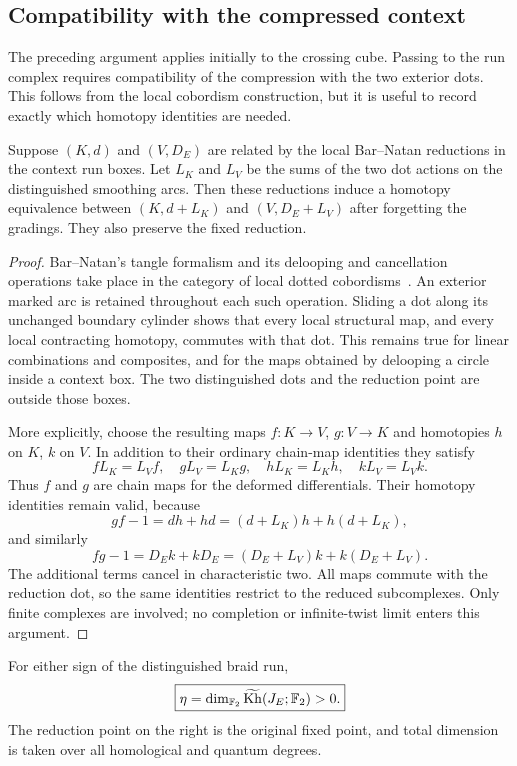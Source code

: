 \subsection{Compatibility with the compressed context}

The preceding argument applies initially to the crossing cube. Passing to
the run complex requires compatibility of the compression with the two
exterior dots. This follows from the local cobordism construction, but it
is useful to record exactly which homotopy identities are needed.

\begin{lemma}\label{slope-compression}
Suppose $(K,d)$ and $(V,D_E)$ are related by the local Bar--Natan
reductions in the context run boxes. Let $L_K$ and $L_V$ be the sums of the
two dot actions on the distinguished smoothing arcs. Then these reductions
induce a homotopy equivalence between $(K,d+L_K)$ and $(V,D_E+L_V)$ after
forgetting the gradings. They also preserve the fixed reduction.
\end{lemma}

\begin{proof}
Bar--Natan's tangle formalism and its delooping and cancellation operations
take place in the category of local dotted cobordisms~\cite{bn05,bn07}.
An exterior marked arc is retained throughout each such operation. Sliding
a dot along its unchanged boundary cylinder shows that every local
structural map, and every local contracting homotopy, commutes with that
dot. This remains true for linear combinations and composites, and for
the maps obtained by delooping a circle inside a context box. The two
distinguished dots and the reduction point are outside those boxes.

More explicitly, choose the resulting maps $f:K\to V$, $g:V\to K$ and
homotopies $h$ on $K$, $k$ on $V$. In addition to their ordinary chain-map
identities they satisfy
\[
 fL_K=L_Vf,\quad gL_V=L_Kg,\quad
 hL_K=L_Kh,\quad kL_V=L_Vk.
\]
Thus $f$ and $g$ are chain maps for the deformed differentials. Their
homotopy identities remain valid, because
\[
 gf-1=dh+hd=(d+L_K)h+h(d+L_K),
\]
and similarly
\[
 fg-1=D_Ek+kD_E=(D_E+L_V)k+k(D_E+L_V).
\]
The additional terms cancel in characteristic two. All maps commute with
the reduction dot, so the same identities restrict to the reduced
subcomplexes. Only finite complexes are involved; no completion or
infinite-twist limit enters this argument.
\end{proof}

\begin{theorem}\label{slope-theorem}
For either sign of the distinguished braid run,
\begin{equation}\label{slope-identity}
 \boxed{\displaystyle
 \eta=\dim_{\mathbb F_2}\widetilde{\operatorname{Kh}}(J_E;\mathbb F_2)>0.}
\end{equation}
The reduction point on the right is the original fixed point, and total
dimension is taken over all homological and quantum degrees.
\end{theorem}

